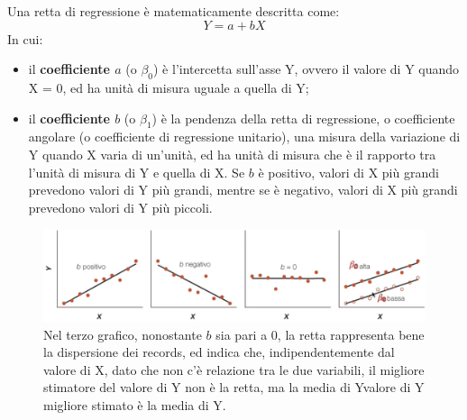\documentclass[10pt, draft]{book}
\newcommand{\tightlist}{%
\setlength{\itemsep}{1pt}\setlength{\parskip}{0pt}\setlength{\parsep}{0pt}}
\begin{document}
Una retta di regressione è matematicamente descritta come:
\begin{equation}
    Y = a+bX
\end{equation}
In cui:
\begin{itemize}\tightlist
    \item il \textbf{coefficiente $a$} (o $\beta_0$) è l'intercetta sull'asse Y, ovvero il valore di Y quando X = 0, ed ha unità di misura uguale a quella di Y;
    \item il \textbf{coefficiente $b$} (o $\beta_1$) è la pendenza della retta di regressione, o coefficiente angolare (o coefficiente di regressione unitario), una misura della variazione di Y quando X varia di un'unità, ed ha unità di misura che è il rapporto tra l'unità di misura di Y e quella di X. Se $b$ è positivo, valori di X più grandi prevedono valori di Y più grandi, mentre se è negativo, valori di X più grandi prevedono valori di Y più piccoli.
\end{itemize}
\begin{figure}[H]
    \centering
    \includegraphics[width=\textwidth]{fig17.1-3}
    \caption{\small{Nel terzo grafico, nonostante $b$ sia pari a 0, la retta rappresenta bene la dispersione dei records, ed indica che, indipendentemente dal valore di X, dato che non c'è relazione tra le due variabili, il migliore stimatore del valore di Y non è la retta, ma la media di Yvalore di Y migliore stimato è la media di Y.}}
    \label{fig17.1-3}
\end{figure}
\end{document}
